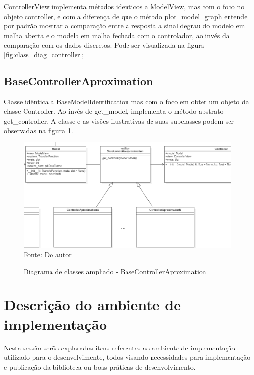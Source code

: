 ControllerView implementa métodos identicos a ModelView, mas com o foco no objeto controller, e com a diferença de que
o método plot\_model\_graph entende por padrão mostrar a comparação entre a resposta a sinal degrau do modelo em malha
aberta e o modelo em malha fechada com o controlador, ao invés da comparação com os dados discretos.
Pode ser visualizada na figura \ref{fig:class_diag_controller};

\subsection{BaseControllerAproximation}

Classe idêntica a BaseModelIdentification mas com o foco em obter um objeto da classe Controller.
Ao invés de get\_model, implementa o método abstrato get\_controller.
A classe e as visões ilustrativas de suas subclasses podem ser observadas na figura \ref{fig:class_diag_bcacontroller}.

\begin{figure}[H]
    \centering
    \caption{Diagrama de classes ampliado - BaseControllerAproximation}
    \includegraphics[scale=0.6]{figuras/class_diag_bcacontroller}
    \label{fig:class_diag_bcacontroller}
    \\
    \vspace{0cm}\hspace{0cm}\small{Fonte: Do autor}
\end{figure}


\section{Descrição do ambiente de implementação}

Nesta sessão serão explorados itens referentes ao ambiente de implementação utilizado para o
desenvolvimento, todos visando necessidades para implementação e publicação da biblioteca ou boas práticas de
desenvolvimento.

